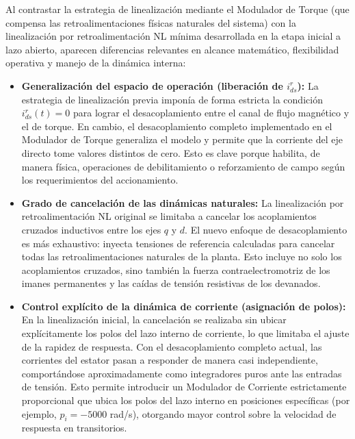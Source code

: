 \documentclass[12pt, a4paper,journal, onecolumn, compsoc]{IEEEtran}
\begin{document}
Al contrastar la estrategia de linealización mediante el Modulador de Torque (que compensa las retroalimentaciones físicas naturales del sistema) con la linealización por retroalimentación NL mínima desarrollada en la etapa inicial a lazo abierto, aparecen diferencias relevantes en alcance matemático, flexibilidad operativa y manejo de la dinámica interna:

\begin{itemize}
    \item \textbf{Generalización del espacio de operación (liberación de $i_{ds}^r$):} 
    La estrategia de linealización previa imponía de forma estricta la condición $i_{ds}^r(t)=0$ para lograr el desacoplamiento entre el canal de flujo magnético y el de torque. En cambio, el desacoplamiento completo implementado en el Modulador de Torque generaliza el modelo y permite que la corriente del eje directo tome valores distintos de cero. Esto es clave porque habilita, de manera física, operaciones de debilitamiento o reforzamiento de campo según los requerimientos del accionamiento.
    
    \item \textbf{Grado de cancelación de las dinámicas naturales:} 
    La linealización por retroalimentación NL original se limitaba a cancelar los acoplamientos cruzados inductivos entre los ejes $q$ y $d$. El nuevo enfoque de desacoplamiento es más exhaustivo: inyecta tensiones de referencia calculadas para cancelar todas las retroalimentaciones naturales de la planta. Esto incluye no solo los acoplamientos cruzados, sino también la fuerza contraelectromotriz de los imanes permanentes y las caídas de tensión resistivas de los devanados.
    
    \item \textbf{Control explícito de la dinámica de corriente (asignación de polos):} 
    En la linealización inicial, la cancelación se realizaba sin ubicar explícitamente los polos del lazo interno de corriente, lo que limitaba el ajuste de la rapidez de respuesta. Con el desacoplamiento completo actual, las corrientes del estator pasan a responder de manera casi independiente, comportándose aproximadamente como integradores puros ante las entradas de tensión. Esto permite introducir un Modulador de Corriente estrictamente proporcional que ubica los polos del lazo interno en posiciones específicas (por ejemplo, $p_i=-5000$ rad/s), otorgando mayor control sobre la velocidad de respuesta en transitorios.
\end{itemize}
\end{document}
